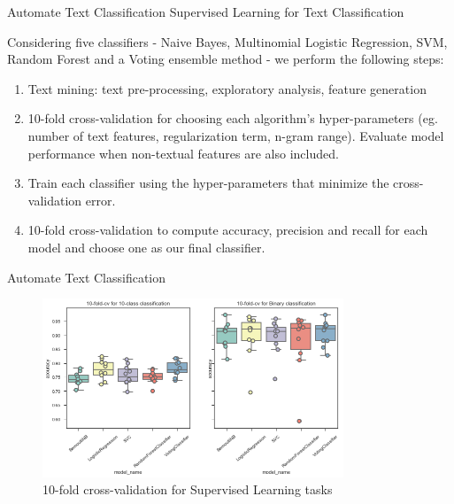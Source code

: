 \documentclass[handout,t,usenames,dvipsnames]{beamer}
\begin{document}
\begin{frame}{Automate Text Classification}
\justifying
{\color{emap-azul-escuro}\large Supervised Learning for Text Classification}
\vspace{0.5em}

Considering five classifiers - Naive Bayes, Multinomial Logistic Regression, SVM, Random Forest and a Voting ensemble method - we perform the following steps:
\vspace{0.5em}

\small
\begin{enumerate}
\justifying
    \item Text mining: text pre-processing, exploratory analysis, feature generation
    \item 10-fold cross-validation for choosing each algorithm's hyper-parameters (eg. number of text features, regularization term, n-gram range). Evaluate model performance when non-textual features are also included.
    \item Train each classifier using the hyper-parameters that minimize the cross-validation error.
    \item 10-fold cross-validation to compute accuracy, precision and recall for each model and choose one as our final classifier.
\end{enumerate}
 
\end{frame}

\begin{frame}{Automate Text Classification}


\begin{figure}[h!]
\includegraphics[width=9cm]{cv.png}
\centering
\caption{10-fold cross-validation for Supervised Learning tasks}
\end{figure}
 
\end{frame}
\end{document}
